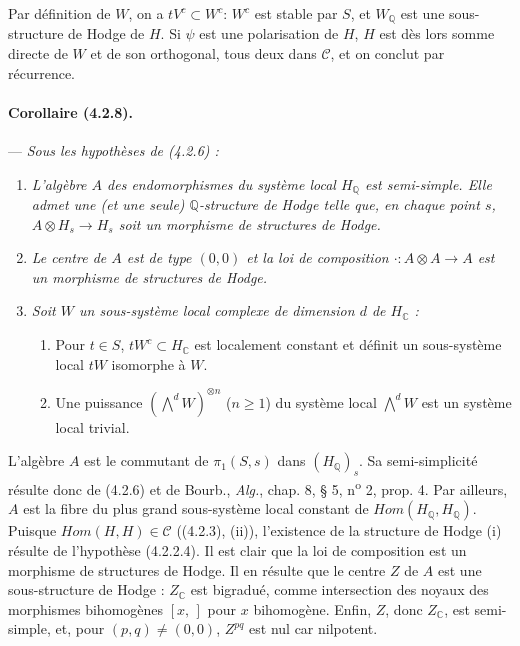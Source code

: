 \documentclass[10pt]{article}
\newcommand{\C}{\mathbb C}
\newcommand{\Q}{\mathbb Q}
\begin{document}
Par définition de $W$, on a $tV^c\subset W^c$: $W^c$ est stable par $S$, et $W_\Q$ est une sous-structure de Hodge de $H$. Si $\psi$ est une polarisation de $H$, $H$ est dès lors somme directe de $W$ et de son orthogonal, tous deux dans $\mathcal C$, et on conclut par récurrence.

\paragraph{Corollaire (4.2.8).} --- {\itshape Sous les hypothèses de (4.2.6) :}
\begin{enumerate}[label=(\roman*)]
\item {\itshape L'algèbre $A$ des endomorphismes du système local $H_\Q$ est semi-simple. Elle admet une (et une seule) $\Q$-structure de Hodge telle que, en chaque point $s$, $A\otimes H_s\to H_s$ soit un morphisme de structures de Hodge.}
\item {\itshape Le centre de $A$ est de type $(0,0)$ et la loi de composition $\cdot : A\otimes A\to A$ est un morphisme de structures de Hodge.}
\item {\itshape Soit $W$ un sous-système local complexe de dimension $d$ de $H_\C$ :
\begin{enumerate}[label=\alph*)]
\item Pour $t\in S$, $tW^c\subset H_\C$ est localement constant et définit un sous-système local $tW$ isomorphe à $W$.
\item Une puissance $(\bigwedge^dW)^{\otimes n}$ ($n\ge1$) du système local $\bigwedge^dW$ est un système local trivial.
\end{enumerate}}
\end{enumerate}

L'algèbre $A$ est le commutant de $\pi_1(S,s)$ dans $(H_\Q)_s$. Sa semi-simplicité résulte donc de (4.2.6) et de Bourb., \textit{Alg.}, chap. 8, § 5, n\textsuperscript{o} 2, prop. 4. Par ailleurs, $A$ est la fibre du plus grand sous-système local constant de $\mathit{Hom}(H_\Q,H_\Q)$. Puisque $\mathit{Hom}(H,H)\in\mathcal C$ ((4.2.3), (ii)), l'existence de la structure de Hodge (i) résulte de l'hypothèse (4.2.2.4). Il est clair que la loi de composition est un morphisme de structures de Hodge. Il en résulte que le centre $Z$ de $A$ est une sous-structure de Hodge : $Z_\C$ est bigradué, comme intersection des noyaux des morphismes bihomogènes $[x,\,]$ pour $x$ bihomogène. Enfin, $Z$, donc $Z_\C$, est semi-simple, et, pour $(p,q)\ne(0,0)$, $Z^{pq}$ est nul car nilpotent.
\end{document}
